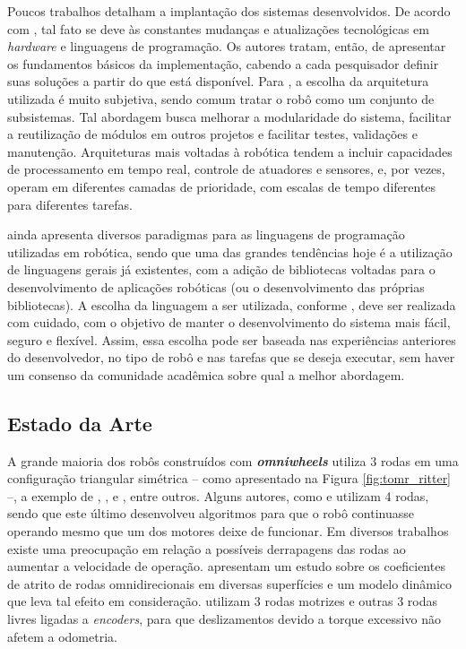 

Poucos trabalhos detalham a implantação dos sistemas desenvolvidos. De acordo com \citet{craig2017introduction}, tal fato se deve às constantes mudanças e atualizações tecnológicas em \textit{hardware} e linguagens de programação. Os autores tratam, então, de apresentar os fundamentos básicos da implementação, cabendo a cada pesquisador definir suas soluções a partir do que está disponível. Para \citet{siciliano2016springer}, a escolha da arquitetura utilizada é muito subjetiva, sendo comum tratar o robô como um conjunto de subsistemas. Tal abordagem busca melhorar a modularidade do sistema, facilitar a reutilização de módulos em outros projetos e facilitar testes, validações e manutenção. Arquiteturas mais voltadas à robótica tendem a incluir capacidades de processamento em  tempo real, controle de atuadores e sensores, e, por vezes, operam em diferentes camadas de prioridade, com escalas de tempo diferentes para diferentes tarefas.

\citet{craig2017introduction} ainda apresenta diversos paradigmas para as linguagens de programação utilizadas em robótica, sendo que uma das grandes tendências hoje é a utilização de linguagens gerais já existentes, com a adição de bibliotecas voltadas para o desenvolvimento de aplicações robóticas (ou o desenvolvimento das próprias bibliotecas). A escolha da linguagem a ser utilizada, conforme \citet{siciliano2016springer}, deve ser realizada com cuidado, com o objetivo de manter o desenvolvimento do sistema mais fácil, seguro e flexível. Assim, essa escolha pode ser baseada nas experiências anteriores do desenvolvedor, no tipo de robô e nas tarefas que se deseja executar, sem haver um consenso da comunidade acadêmica sobre qual a melhor abordagem.

\subsection{Estado da Arte}


A grande maioria dos robôs construídos com \textbf{\emph{omniwheels}} utiliza 3 rodas em uma configuração triangular simétrica -- como apresentado na Figura \ref{fig:tomr_ritter} --, a exemplo de \citet{ritter2016modelagem}, \citet{samani2007comprehensive}, \citet{williams2002dynamic} e \citet{indiveri2009swedish}, entre outros. Alguns autores, como \citet{krinkin2015design} e \citet{rojas2006holonomic} utilizam 4 rodas, sendo que este último desenvolveu algoritmos para que o robô continuasse operando mesmo que um dos motores deixe de funcionar. Em diversos trabalhos existe uma preocupação em relação a possíveis derrapagens das rodas ao aumentar a velocidade de operação. \citet{williams2002dynamic} apresentam um estudo sobre os coeficientes de atrito de rodas omnidirecionais em diversas superfícies e um modelo dinâmico que leva tal efeito em consideração. \citet{samani2007comprehensive} utilizam 3 rodas motrizes e outras 3 rodas livres ligadas a \textit{encoders}, para que deslizamentos devido a torque excessivo não afetem a odometria.

